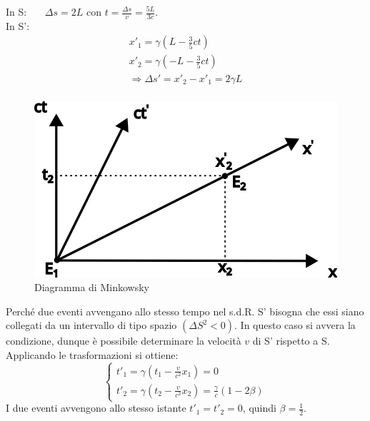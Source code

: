 \documentclass[12pt,twoside,a4]{article}
\begin{document}
\newpage
\begin{solution}
 In S: \ \ \ $\Delta s = 2L$ con $t = \frac{\Delta s}{v} = \frac{5 L }{3 c}$. \\
 In S':
 \begin{gather}
    x'_1 = \gamma (L - \frac{3}{5} c t) \\
    x'_2 = \gamma (- L - \frac{3}{5} c t) \\
    \Rightarrow   \Delta s' = x'_2 - x'_1 = 2\gamma L \\     
 \end{gather}
 \end{solution}

 \begin{solution}
 	\begin{figure}[H]
 		\centering
		\includegraphics[height=0.25  \linewidth]{mink.png}
		\caption{Diagramma di Minkowsky}
 	\end{figure}
	 Perché due eventi avvengano allo stesso tempo nel s.d.R. S' bisogna che essi siano collegati da un intervallo di tipo spazio $(\Delta S^2 < 0)$. In questo caso si avvera la condizione, dunque è possibile determinare la velocità $v$ di S' rispetto a S. Applicando le trasformazioni si ottiene: 
 \begin{equation*}
 	\begin{cases}
    t'_1 = \gamma \left(t_1 - \frac{v}{c^2} x_1 \right) = 0  \\[1em]
    t'_2 = \gamma \left(t_2 - \frac{v}{c^2} x_2 \right) = \frac{\gamma}{c} (1-2\beta)   
    \end{cases}  
 \end{equation*}
 I due eventi avvengono allo stesso istante $t'_1 = t'_2 = 0$, quindi $\beta = \frac{1}{2}$.
\end{solution}
\end{document}
